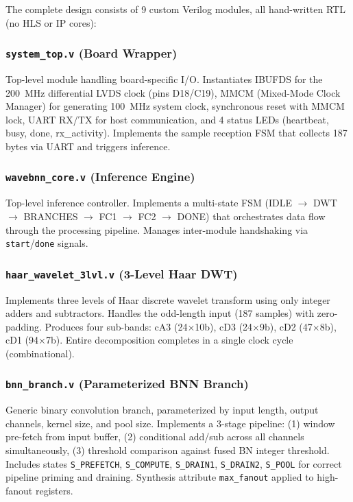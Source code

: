 \documentclass[conference]{IEEEtran}
\begin{document}
The complete design consists of 9 custom Verilog modules, all hand-written RTL (no HLS or IP cores):

\subsubsection{\texttt{system\_top.v} (Board Wrapper)}
Top-level module handling board-specific I/O. Instantiates IBUFDS for the 200~MHz differential LVDS clock (pins D18/C19), MMCM (Mixed-Mode Clock Manager) for generating 100~MHz system clock, synchronous reset with MMCM lock, UART RX/TX for host communication, and 4 status LEDs (heartbeat, busy, done, rx\_activity). Implements the sample reception FSM that collects 187 bytes via UART and triggers inference.

\subsubsection{\texttt{wavebnn\_core.v} (Inference Engine)}
Top-level inference controller. Implements a multi-state FSM (IDLE $\rightarrow$ DWT $\rightarrow$ BRANCHES $\rightarrow$ FC1 $\rightarrow$ FC2 $\rightarrow$ DONE) that orchestrates data flow through the processing pipeline. Manages inter-module handshaking via \texttt{start}/\texttt{done} signals.

\subsubsection{\texttt{haar\_wavelet\_3lvl.v} (3-Level Haar DWT)}
Implements three levels of Haar discrete wavelet transform using only integer adders and subtractors. Handles the odd-length input (187 samples) with zero-padding. Produces four sub-bands: cA3 (24$\times$10b), cD3 (24$\times$9b), cD2 (47$\times$8b), cD1 (94$\times$7b). Entire decomposition completes in a single clock cycle (combinational).

\subsubsection{\texttt{bnn\_branch.v} (Parameterized BNN Branch)}
Generic binary convolution branch, parameterized by input length, output channels, kernel size, and pool size. Implements a 3-stage pipeline: (1) window pre-fetch from input buffer, (2) conditional add/sub across all channels simultaneously, (3) threshold comparison against fused BN integer threshold. Includes states \texttt{S\_PREFETCH}, \texttt{S\_COMPUTE}, \texttt{S\_DRAIN1}, \texttt{S\_DRAIN2}, \texttt{S\_POOL} for correct pipeline priming and draining. Synthesis attribute \texttt{max\_fanout} applied to high-fanout registers.
\end{document}
